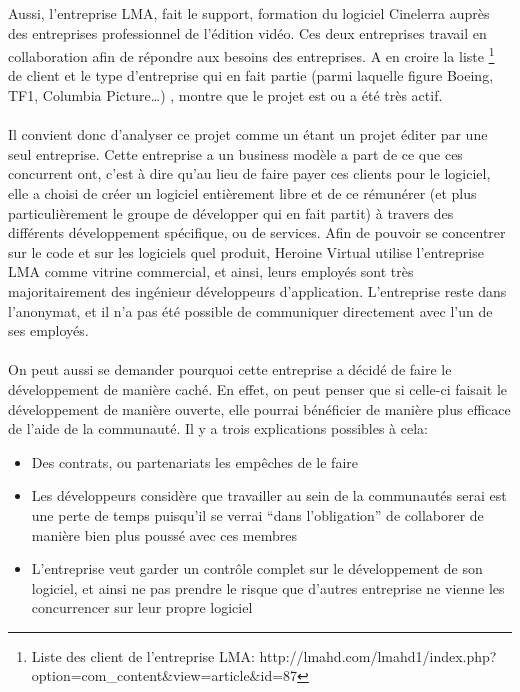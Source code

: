 Aussi, l'entreprise LMA, fait le support, formation du logiciel Cinelerra
auprès des entreprises professionnel de l'édition vidéo. Ces deux
entreprises travail en collaboration afin de répondre aux besoins
des entreprises. A en croire la liste \footnote{Liste des client de
l'entreprise LMA:
  http://lmahd.com/lmahd1/index.php?option=com\_content\&view=article\&id=87}
de client et le type d'entreprise qui en fait partie (parmi laquelle
figure Boeing, TF1, Columbia Picture\ldots) , montre que le projet est
ou a été très actif.

\paragraph{}

Il convient donc d'analyser ce projet comme un étant un projet éditer
par une seul entreprise. Cette entreprise a un business modèle a
part de ce que ces concurrent ont, c'est à dire qu'au lieu de faire
payer ces clients pour le logiciel, elle a choisi de créer un logiciel
entièrement libre et de ce rémunérer (et plus particulièrement le
groupe de développer qui en fait partit) à travers des différents
développement spécifique, ou de services.  Afin de pouvoir se concentrer
sur le code et sur les logiciels quel produit, Heroine Virtual utilise
l'entreprise LMA comme vitrine commercial, et ainsi, leurs employés
sont très majoritairement des ingénieur développeurs d'application.
L'entreprise reste dans l'anonymat, et il n'a pas été possible de
communiquer directement avec l'un de ses employés.

\paragraph{}

On peut aussi se demander pourquoi cette entreprise a décidé de faire
le développement de manière caché. En effet, on peut penser que si
celle-ci faisait le développement de manière ouverte, elle pourrai
bénéficier de manière plus efficace de l'aide de la communauté. Il
y a trois explications possibles à cela:

\begin{itemize}

  \item {Des contrats, ou partenariats les empêches de le faire}

  \item {Les développeurs considère que travailler au sein de la
  communautés serai est
    une perte de temps puisqu'il se verrai ``dans l'obligation'' de
    collaborer de manière bien plus poussé avec ces membres}

  \item {L'entreprise veut garder un contrôle complet sur le
    développement de son logiciel, et ainsi ne pas prendre le risque
    que d'autres entreprise ne vienne les concurrencer sur leur propre
    logiciel}

\end{itemize}


